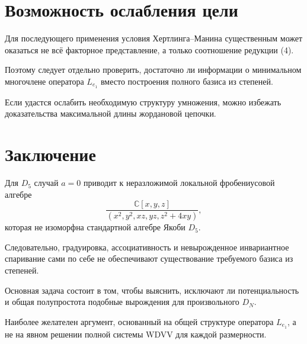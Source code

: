 \section{Возможность ослабления цели}

Для последующего применения условия
Хертлинга--Манина существенным может
оказаться не всё факторное представление,
а только соотношение редукции (4).

Поэтому следует отдельно проверить,
достаточно ли информации о минимальном
многочлене оператора $L_{e_1}$ вместо
построения полного базиса из степеней.

Если удастся ослабить необходимую
структуру умножения, можно избежать
доказательства максимальной длины
жордановой цепочки.

\section{Заключение}

Для $D_5$ случай $a=0$ приводит к
неразложимой локальной фробениусовой
алгебре
\[
\frac{\mathbb C[x,y,z]}
{(x^2,y^2,xz,yz,z^2+4xy)},
\]
которая не изоморфна стандартной
алгебре Якоби $D_5$.

Следовательно, градуировка,
ассоциативность и невырожденное
инвариантное спаривание сами по себе
не обеспечивают существование
требуемого базиса из степеней.

Основная задача состоит в том, чтобы
выяснить, исключают ли потенциальность
и общая полупростота подобные
вырождения для произвольного $D_N$.

Наиболее желателен аргумент,
основанный на общей структуре
оператора $L_{e_1}$, а не на
явном решении полной системы WDVV
для каждой размерности.\fi